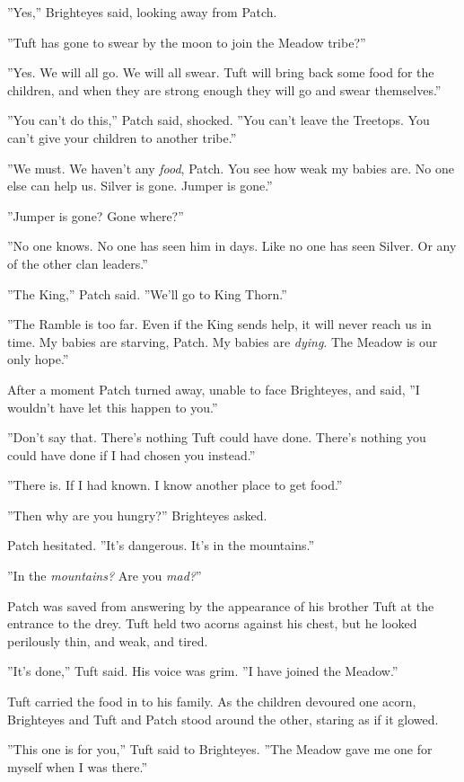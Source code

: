 \documentclass[11pt]{article}
\begin{document}
 ''Yes,'' Brighteyes said, looking away from Patch.\par
 ''Tuft has gone to swear by the moon to join the Meadow tribe?''\par
 ''Yes. We will all go. We will all swear. Tuft will bring back some food for the children, and when they are strong enough they will go and swear themselves.''\par
 ''You can't do this,'' Patch said, shocked. ''You can't leave the Treetops. You can't give your children to another tribe.''\par
 ''We must. We haven't any {\it food}, Patch. You see how weak my babies are. No one else can help us. Silver is gone. Jumper is gone.''\par
 ''Jumper is gone? Gone where?''\par
 ''No one knows. No one has seen him in days. Like no one has seen Silver. Or any of the other clan leaders.''\par
 ''The King,'' Patch said. ''We'll go to King Thorn.''\par
 ''The Ramble is too far. Even if the King sends help, it will never reach us in time. My babies are starving, Patch. My babies are {\it dying}. The Meadow is our only hope.''\par
 After a moment Patch turned away, unable to face Brighteyes, and said, ''I wouldn't have let this happen to you.''\par
 ''Don't say that. There's nothing Tuft could have done. There's nothing you could have done if I had chosen you instead.''\par
 ''There is. If I had known. I know another place to get food.''\par
 ''Then why are you hungry?'' Brighteyes asked.\par
 Patch hesitated. ''It's dangerous. It's in the mountains.''\par
 ''In the {\it mountains?} Are you {\it mad?}''\par
 Patch was saved from answering by the appearance of his brother Tuft at the entrance to the drey. Tuft held two acorns against his chest, but he looked perilously thin, and weak, and tired.\par
 ''It's done,'' Tuft said. His voice was grim. ''I have joined the Meadow.''\par
Tuft carried the food in to his family. As the children devoured one acorn, Brighteyes and Tuft and Patch stood around the other, staring as if it glowed.\par
 ''This one is for you,'' Tuft said to Brighteyes. ''The Meadow gave me one for myself when I was there.''\par
\end{document}
